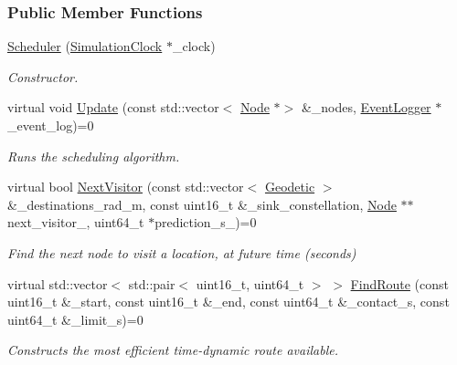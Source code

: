 \subsubsection*{Public Member Functions}
\begin{DoxyCompactItemize}
\item 
\hyperlink{classosse_1_1collaborate_1_1_scheduler_a7052cb2998cbcce276e1c0b45b5aaa6a}{Scheduler} (\hyperlink{classosse_1_1collaborate_1_1_simulation_clock}{Simulation\+Clock} $\ast$\+\_\+clock)
\begin{DoxyCompactList}\small\item\em Constructor. \end{DoxyCompactList}\item 
virtual void \hyperlink{classosse_1_1collaborate_1_1_scheduler_a84241d85d4b53716d3918f44c56875b2}{Update} (const std\+::vector$<$ \hyperlink{classosse_1_1collaborate_1_1_node}{Node} $\ast$$>$ \&\+\_\+nodes, \hyperlink{classosse_1_1collaborate_1_1_event_logger}{Event\+Logger} $\ast$\+\_\+event\+\_\+log)=0
\begin{DoxyCompactList}\small\item\em Runs the scheduling algorithm. \end{DoxyCompactList}\item 
virtual bool \hyperlink{classosse_1_1collaborate_1_1_scheduler_ababb48a841ec1b4903b69e799e43babf}{Next\+Visitor} (const std\+::vector$<$ \hyperlink{classosse_1_1collaborate_1_1_geodetic}{Geodetic} $>$ \&\+\_\+destinations\+\_\+rad\+\_\+m, const uint16\+\_\+t \&\+\_\+sink\+\_\+constellation, \hyperlink{classosse_1_1collaborate_1_1_node}{Node} $\ast$$\ast$next\+\_\+visitor\+\_\+, uint64\+\_\+t $\ast$prediction\+\_\+s\+\_\+)=0
\begin{DoxyCompactList}\small\item\em Find the next node to visit a location, at future time (seconds) \end{DoxyCompactList}\item 
virtual std\+::vector$<$ std\+::pair$<$ uint16\+\_\+t, uint64\+\_\+t $>$ $>$ \hyperlink{classosse_1_1collaborate_1_1_scheduler_a060f7f9e1d09ca22cb43ded4b3c5d10c}{Find\+Route} (const uint16\+\_\+t \&\+\_\+start, const uint16\+\_\+t \&\+\_\+end, const uint64\+\_\+t \&\+\_\+contact\+\_\+s, const uint64\+\_\+t \&\+\_\+limit\+\_\+s)=0
\begin{DoxyCompactList}\small\item\em Constructs the most efficient time-\/dynamic route available. \end{DoxyCompactList}\item 

\end{DoxyCompactItemize}
